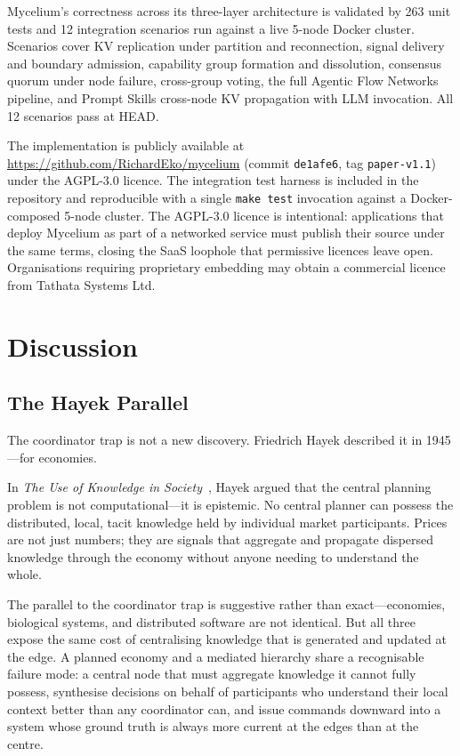 \documentclass[11pt]{article}
\begin{document}
Mycelium's correctness across its three-layer architecture is validated by 263
unit tests and 12 integration scenarios run against a live 5-node Docker cluster.
Scenarios cover KV replication under partition and reconnection, signal delivery
and boundary admission, capability group formation and dissolution, consensus
quorum under node failure, cross-group voting, the full Agentic Flow Networks
pipeline, and Prompt Skills cross-node KV propagation with LLM invocation. All
12 scenarios pass at HEAD.

The implementation is publicly available at
\url{https://github.com/RichardEko/mycelium} (commit
\texttt{de1afe6}, tag \texttt{paper-v1.1}) under the AGPL-3.0 licence.
The integration test harness is included in the repository and reproducible with a
single \texttt{make test} invocation against a Docker-composed 5-node cluster.
The AGPL-3.0 licence is intentional: applications that deploy Mycelium as part of a
networked service must publish their source under the same terms, closing the
SaaS loophole that permissive licences leave open. Organisations requiring
proprietary embedding may obtain a commercial licence from Tathata Systems Ltd.

\section{Discussion}

\subsection{The Hayek Parallel}

The coordinator trap is not a new discovery. Friedrich Hayek described it in
1945---for economies.

In \emph{The Use of Knowledge in Society}~\cite{hayek}, Hayek argued that the
central planning problem is not computational---it is epistemic. No central
planner can possess the distributed, local, tacit knowledge held by individual
market participants. Prices are not just numbers; they are signals that aggregate
and propagate dispersed knowledge through the economy without anyone needing to
understand the whole.

The parallel to the coordinator trap is suggestive rather than exact---economies,
biological systems, and distributed software are not identical. But all three
expose the same cost of centralising knowledge that is generated and updated at
the edge. A planned economy and a mediated hierarchy share a recognisable failure
mode: a central node that must aggregate knowledge it cannot fully possess,
synthesise decisions on behalf of participants who understand their local context
better than any coordinator can, and issue commands downward into a system whose
ground truth is always more current at the edges than at the centre.
\end{document}
